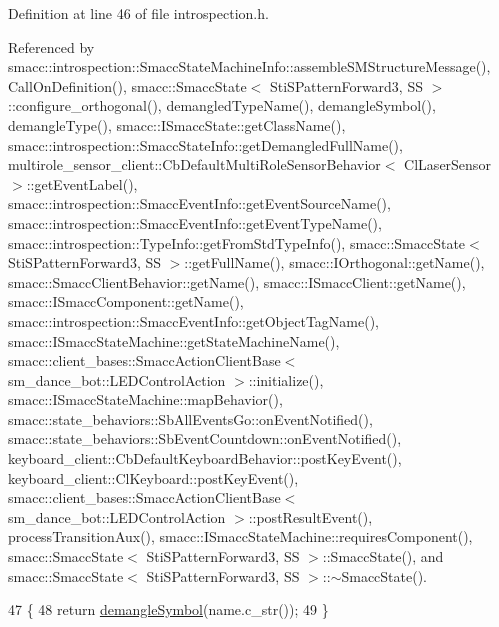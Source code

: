 Definition at line 46 of file introspection.\+h.



Referenced by smacc\+::introspection\+::\+Smacc\+State\+Machine\+Info\+::assemble\+S\+M\+Structure\+Message(), Call\+On\+Definition(), smacc\+::\+Smacc\+State$<$ Sti\+S\+Pattern\+Forward3, S\+S $>$\+::configure\+\_\+orthogonal(), demangled\+Type\+Name(), demangle\+Symbol(), demangle\+Type(), smacc\+::\+I\+Smacc\+State\+::get\+Class\+Name(), smacc\+::introspection\+::\+Smacc\+State\+Info\+::get\+Demangled\+Full\+Name(), multirole\+\_\+sensor\+\_\+client\+::\+Cb\+Default\+Multi\+Role\+Sensor\+Behavior$<$ Cl\+Laser\+Sensor $>$\+::get\+Event\+Label(), smacc\+::introspection\+::\+Smacc\+Event\+Info\+::get\+Event\+Source\+Name(), smacc\+::introspection\+::\+Smacc\+Event\+Info\+::get\+Event\+Type\+Name(), smacc\+::introspection\+::\+Type\+Info\+::get\+From\+Std\+Type\+Info(), smacc\+::\+Smacc\+State$<$ Sti\+S\+Pattern\+Forward3, S\+S $>$\+::get\+Full\+Name(), smacc\+::\+I\+Orthogonal\+::get\+Name(), smacc\+::\+Smacc\+Client\+Behavior\+::get\+Name(), smacc\+::\+I\+Smacc\+Client\+::get\+Name(), smacc\+::\+I\+Smacc\+Component\+::get\+Name(), smacc\+::introspection\+::\+Smacc\+Event\+Info\+::get\+Object\+Tag\+Name(), smacc\+::\+I\+Smacc\+State\+Machine\+::get\+State\+Machine\+Name(), smacc\+::client\+\_\+bases\+::\+Smacc\+Action\+Client\+Base$<$ sm\+\_\+dance\+\_\+bot\+::\+L\+E\+D\+Control\+Action $>$\+::initialize(), smacc\+::\+I\+Smacc\+State\+Machine\+::map\+Behavior(), smacc\+::state\+\_\+behaviors\+::\+Sb\+All\+Events\+Go\+::on\+Event\+Notified(), smacc\+::state\+\_\+behaviors\+::\+Sb\+Event\+Countdown\+::on\+Event\+Notified(), keyboard\+\_\+client\+::\+Cb\+Default\+Keyboard\+Behavior\+::post\+Key\+Event(), keyboard\+\_\+client\+::\+Cl\+Keyboard\+::post\+Key\+Event(), smacc\+::client\+\_\+bases\+::\+Smacc\+Action\+Client\+Base$<$ sm\+\_\+dance\+\_\+bot\+::\+L\+E\+D\+Control\+Action $>$\+::post\+Result\+Event(), process\+Transition\+Aux(), smacc\+::\+I\+Smacc\+State\+Machine\+::requires\+Component(), smacc\+::\+Smacc\+State$<$ Sti\+S\+Pattern\+Forward3, S\+S $>$\+::\+Smacc\+State(), and smacc\+::\+Smacc\+State$<$ Sti\+S\+Pattern\+Forward3, S\+S $>$\+::$\sim$\+Smacc\+State().


\begin{DoxyCode}
47 \{
48     \textcolor{keywordflow}{return} \hyperlink{namespacesmacc_1_1introspection_aa9158a0ff0cfe83a59877e6af7d7f873}{demangleSymbol}(name.c\_str());
49 \}
\end{DoxyCode}


